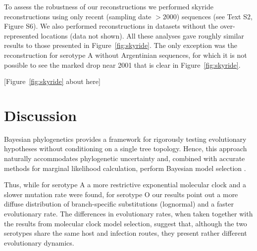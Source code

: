 \documentclass[10pt]{article}
\begin{document}
To assess the robustness of our reconstructions we performed skyride reconstructions using only recent (sampling date $>2000$) sequences (see Text S2, Figure S6).
We also performed reconstructions in datasets without the over-represented locations (data not shown). All these analyses gave roughly similar results to those presented in Figure~\ref{fig:skyride}. The only exception was the reconstruction for serotype A without Argentinian sequences, for which it is not possible to see the marked drop near 2001 that is clear in Figure~\ref{fig:skyride}. 

\begin{center}
 [Figure~\ref{fig:skyride} about here]
\end{center}

\section*{Discussion}
Bayesian phylogenetics provides a framework for rigorously testing evolutionary hypotheses without conditioning on a single tree topology. Hence, this approach naturally accommodates phylogenetic uncertainty and, combined with accurate methods for marginal likelihood calculation, perform Bayesian model selection \cite{Baele2012,Baele2013a,Baele2013b}.

Thus, while for serotype A a more restrictive exponential molecular clock and a slower mutation rate were found, for serotype O our results point out a more diffuse distribution of branch-specific substitutions (lognormal) and a faster evolutionary rate.
The differences in evolutionary rates, when taken together with the results from molecular clock model selection, suggest that, although the two serotypes share the same host and infection routes, they present rather different evolutionary dynamics. 
\end{document}

